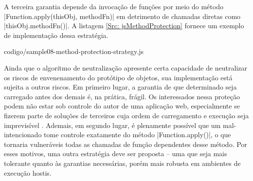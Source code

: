 A terceira garantia depende da invocação de funções por meio do método |Function.apply(thisObj, methodFn)| em detrimento de chamadas diretas como |thisObj.methodFn()|. A listagem \ref{Src: jsMethodProtection} fornece um exemplo de implementação dessa estratégia.


	{codigo/sample08-method-protection-strategy.js}


Ainda que o algoritmo de neutralização apresente certa capacidade de neutralizar os riscos de envenenamento do protótipo de objetos, sua implementação está sujeita a outros riscos. Em primeiro lugar, a garantia de que determinado {\script} seja carregado antes dos demais é, na prática, frágil. Os {\scripts} interessados nessa proteção podem não estar sob controle do autor de uma aplicação web, especialmente se fizerem parte de soluções de terceiros cuja ordem de carregamento e execução seja imprevisível . Ademais, em segundo lugar, é plenamente possível que um {\script} mal-intencionado tome controle exatamente do método |Function.apply()|, o que tornaria vulneráveis todas as chamadas de função dependentes desse método. Por esses motivos, uma outra estratégia deve ser proposta -- uma que seja mais tolerante quanto às garantias necessárias, porém mais robusta em ambientes de execução hostis.